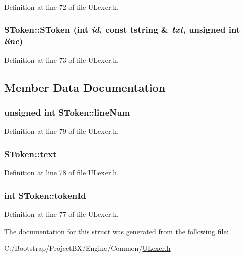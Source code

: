 Definition at line 72 of file ULexer.h.\hypertarget{struct_s_token_439c02d6db740f25159368872a3f829f}{
\subsubsection[{SToken}]{\setlength{\rightskip}{0pt plus 5cm}SToken::SToken (int {\em id}, \/  const {\bf tstring} \& {\em txt}, \/  unsigned int {\em line})}}
\label{struct_s_token_439c02d6db740f25159368872a3f829f}




Definition at line 73 of file ULexer.h.

\subsection{Member Data Documentation}
\hypertarget{struct_s_token_c827f15515a079d2aa999cd0597ea24a}{
\subsubsection[{lineNum}]{\setlength{\rightskip}{0pt plus 5cm}unsigned int {\bf SToken::lineNum}}}
\label{struct_s_token_c827f15515a079d2aa999cd0597ea24a}




Definition at line 79 of file ULexer.h.\hypertarget{struct_s_token_ce9a673e01ca17ce1bceec9a38b7c695}{
\subsubsection[{text}]{ {\bf SToken::text}}}
\label{struct_s_token_ce9a673e01ca17ce1bceec9a38b7c695}




Definition at line 78 of file ULexer.h.\hypertarget{struct_s_token_e0468cab0048129a2a94530c8d17f55a}{
\subsubsection[{tokenId}]{\setlength{\rightskip}{0pt plus 5cm}int {\bf SToken::tokenId}}}
\label{struct_s_token_e0468cab0048129a2a94530c8d17f55a}




Definition at line 77 of file ULexer.h.

The documentation for this struct was generated from the following file:\begin{CompactItemize}
\item 
C:/Bootstrap/ProjectBX/Engine/Common/\hyperlink{_u_lexer_8h}{ULexer.h}\end{CompactItemize}
